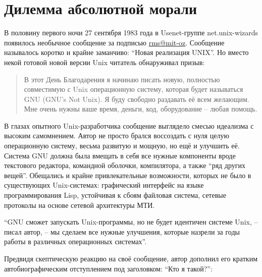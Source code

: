 
\chapter{Дилемма абсолютной морали}

В половину первого ночи 27 сентября 1983 года в Usenet-группе net.unix-wizards появилось необычное сообщение за подписью \url{rms@mit-oz}. Сообщение называлось коротко и крайне заманчиво: \enquote{Новая реализация UNIX}. Но вместо некой готовой новой версии Unix читатель обнаруживал призыв:

\begin{quote}
В этот День Благодарения я начинаю писать новую, полностью совместимую с Unix операционную систему, которая будет называться GNU (GNU's Not Unix). Я буду свободно раздавать её всем желающим. Мне очень нужны ваше время, деньги, код, оборудование -- любая помощь. 
\end{quote}

В глазах опытного Unix-разработчика сообщение выглядело смесью идеализма с высоким самомнением. Автор не просто брался воссоздать с нуля целую операционную систему, весьма развитую и мощную, но ещё и улучшить её. Система GNU должна была вмещать в себя все нужные компоненты вроде текстового редактора, командной оболочки, компилятора, а также \enquote{ряд других вещей}.  Обещались и крайне привлекательные возможности, которых не было в существующих Unix-системах: графический интерфейс на языке программирования Lisp, устойчивая к сбоям файловая система, сетевые протоколы на основе сетевой архитектуры МТИ.

\enquote{GNU сможет запускать Unix-программы, но не будет идентичен системе Unix, -- писал автор, -- мы сделаем все нужные улучшения, которые назрели за годы работы в различных операционных системах}.

Предвидя скептическую реакцию на своё сообщение, автор дополнил его кратким автобиографическим отступлением под заголовком: \enquote{Кто я такой?}:

